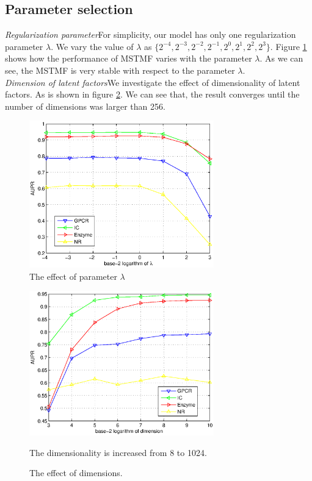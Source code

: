 \documentclass{article}
\begin{document}
\subsection{Parameter selection}
\textit{Regularization parameter}\quad For simplicity, our model has only one regularization parameter $\lambda$. We vary the value of $\lambda$ as $\{ 2^{-4},2^{-3},2^{-2},2^{-1},2^{0},2^{1},2^{2},2^{3}\}$. Figure \ref{effect_lambda} shows how the performance of MSTMF varies with the parameter $\lambda$. As we can see, the MSTMF is very stable with respect to the parameter $\lambda$.\\
\textit{Dimension of latent factors}\quad We investigate the effect of dimensionality of latent factors. As is shown in figure \ref{effect_dim}. We can see that, the result converges until the number of dimensions was larger than 256.
\begin{figure} [htbp]
\centering
\includegraphics[width=8cm]{effect_lambda}
\caption{The effect of parameter $\lambda$}\label{effect_lambda}
\end{figure}
\begin{figure} [htbp]
\centering
\includegraphics[width=8cm]{effect_dim}
\caption{The effect of dimensions.}\label{effect_dim}
The dimensionality is increased from 8 to 1024.
\end{figure}
\end{document}
